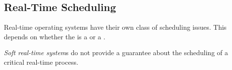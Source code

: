 \subsection{Real-Time Scheduling}\label{subsec:Real_Time_Scheduling}
Real-time operating systems have their own class of scheduling issues.
This depends on whether the  is a  or a .

\begin{definition}\label{def:Soft_Real_Time_System}
  \emph{Soft real-time system}s do not provide a guarantee about the scheduling of a critical real-time process.
\end{definition}


